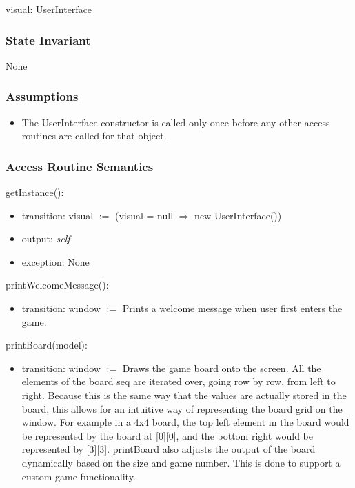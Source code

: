 \documentclass[12pt]{article}
\begin{document}
visual: UserInterface

\subsubsection* {State Invariant}

None

\subsubsection* {Assumptions}

\begin{itemize}
\item The UserInterface constructor is called only once before any other access routines are called for that object.
\end{itemize}

\subsubsection* {Access Routine Semantics}

\noindent getInstance():
\begin{itemize}
  \item transition: visual $:=$ (visual = null $\Rightarrow$ new UserInterface())
  \item output: \textit{self}
  \item exception: None
\end{itemize}

\bigskip

\noindent printWelcomeMessage():
\begin{itemize}
\item transition: window $:=$ Prints a welcome message when user first enters the game.
\end{itemize}

\bigskip

\noindent printBoard(model):
\begin{itemize}
\item transition: window $:=$ Draws the game board onto the screen. All the elements of the board seq are iterated over, going row by row, from left to right. Because this is the same way that the values are actually stored in the board, this allows for an intuitive way of representing the board grid on the window. For example in a 4x4 board, the top left element in the board would be represented by the board at [0][0], and the bottom right would be represented by [3][3]. printBoard also adjusts the output of the board dynamically based on the size and game number. This is done to support a custom game functionality.
\end{itemize}
\end{document}
